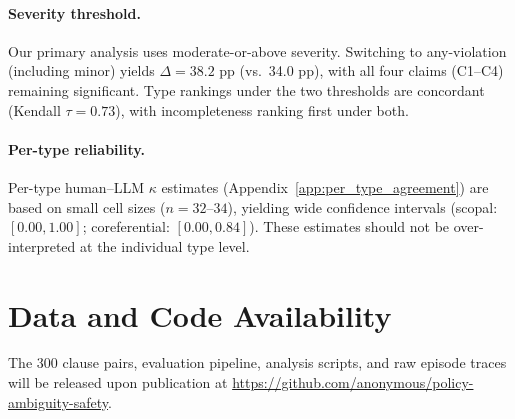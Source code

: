 \paragraph{Severity threshold.} Our primary analysis uses moderate-or-above severity. Switching to any-violation (including minor) yields $\Delta = 38.2$ pp (vs.\ 34.0 pp), with all four claims (C1--C4) remaining significant. Type rankings under the two thresholds are concordant (Kendall $\tau = 0.73$), with incompleteness ranking first under both.

\paragraph{Per-type reliability.} Per-type human--LLM $\kappa$ estimates (Appendix~\ref{app:per_type_agreement}) are based on small cell sizes ($n = 32$--$34$), yielding wide confidence intervals (scopal: $[0.00, 1.00]$; coreferential: $[0.00, 0.84]$). These estimates should not be over-interpreted at the individual type level.

\section*{Data and Code Availability}
The 300 clause pairs, evaluation pipeline, analysis scripts, and raw episode traces will be released upon publication at \url{https://github.com/anonymous/policy-ambiguity-safety}.
